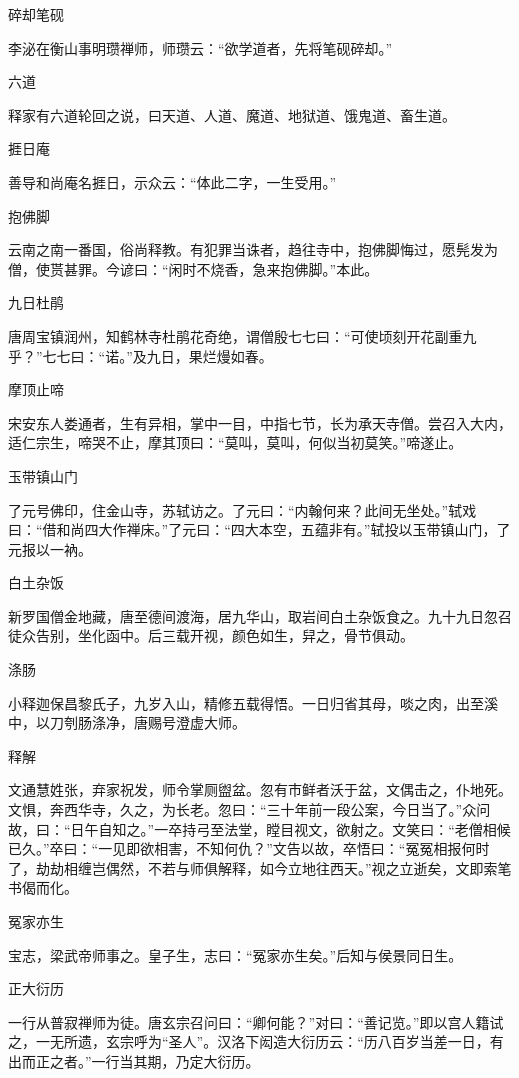 \documentclass[a4paper,12pt,UTF8,twoside]{ctexbook}
\begin{document}
    碎却笔砚
    
    李泌在衡山事明瓒禅师，师瓒云：“欲学道者，先将笔砚碎却。”
    
    六道
    
    释家有六道轮回之说，曰天道、人道、魔道、地狱道、饿鬼道、畜生道。
    
    捱日庵
    
    善导和尚庵名捱日，示众云：“体此二字，一生受用。”
    
    抱佛脚
    
    云南之南一番国，俗尚释教。有犯罪当诛者，趋往寺中，抱佛脚悔过，愿髡发为僧，使贳甚罪。今谚曰：“闲时不烧香，急来抱佛脚。”本此。
    
    九日杜鹃
    
    唐周宝镇润州，知鹤林寺杜鹃花奇绝，谓僧殷七七曰：“可使顷刻开花副重九乎？”七七曰：“诺。”及九日，果烂熳如春。
    
    摩顶止啼
    
    宋安东人娄通者，生有异相，掌中一目，中指七节，长为承天寺僧。尝召入大内，适仁宗生，啼哭不止，摩其顶曰：“莫叫，莫叫，何似当初莫笑。”啼遂止。
    
    玉带镇山门
    
    了元号佛印，住金山寺，苏轼访之。了元曰：“内翰何来？此间无坐处。”轼戏曰：“借和尚四大作禅床。”了元曰：“四大本空，五蕴非有。”轼投以玉带镇山门，了元报以一衲。
    
    白土杂饭
    
    新罗国僧金地藏，唐至德间渡海，居九华山，取岩间白土杂饭食之。九十九日忽召徒众告别，坐化函中。后三载开视，颜色如生，舁之，骨节俱动。
    
    涤肠
    
    小释迦保昌黎氏子，九岁入山，精修五载得悟。一日归省其母，啖之肉，出至溪中，以刀刳肠涤净，唐赐号澄虚大师。
    
    释解
    
    文通慧姓张，弃家祝发，师令掌厕盥盆。忽有市鲜者沃于盆，文偶击之，仆地死。文惧，奔西华寺，久之，为长老。忽曰：“三十年前一段公案，今日当了。”众问故，曰：“日午自知之。”一卒持弓至法堂，瞠目视文，欲射之。文笑曰：“老僧相候已久。”卒曰：“一见即欲相害，不知何仇？”文告以故，卒悟曰：“冤冤相报何时了，劫劫相缠岂偶然，不若与师俱解释，如今立地往西天。”视之立逝矣，文即索笔书偈而化。
    
    冤家亦生
    
    宝志，梁武帝师事之。皇子生，志曰：“冤家亦生矣。”后知与侯景同日生。
    
    正大衍历
    
    一行从普寂禅师为徒。唐玄宗召问曰：“卿何能？”对曰：“善记览。”即以宫人籍试之，一无所遗，玄宗呼为“圣人”。汉洛下闳造大衍历云：“历八百岁当差一日，有出而正之者。”一行当其期，乃定大衍历。
    
\end{document}
